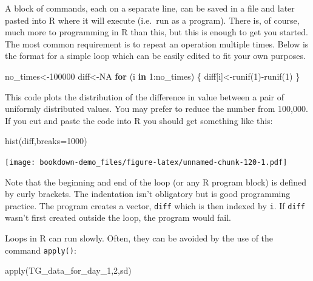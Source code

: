 \documentclass[
]{book}
\newenvironment{Shaded}{\begin{snugshade}}{\end{snugshade}}
\newcommand{\AttributeTok}[1]{\textcolor[rgb]{0.77,0.63,0.00}{#1}}
\newcommand{\ConstantTok}[1]{\textcolor[rgb]{0.00,0.00,0.00}{#1}}
\newcommand{\ControlFlowTok}[1]{\textcolor[rgb]{0.13,0.29,0.53}{\textbf{#1}}}
\newcommand{\DecValTok}[1]{\textcolor[rgb]{0.00,0.00,0.81}{#1}}
\newcommand{\FunctionTok}[1]{\textcolor[rgb]{0.00,0.00,0.00}{#1}}
\newcommand{\NormalTok}[1]{#1}
\newcommand{\OtherTok}[1]{\textcolor[rgb]{0.56,0.35,0.01}{#1}}
\newcommand{\SpecialCharTok}[1]{\textcolor[rgb]{0.00,0.00,0.00}{#1}}
\begin{document}
A block of commands, each on a separate line, can be saved in a file and later pasted into R where it will execute (i.e.~run as a program). There is, of course, much more to programming in R than this, but this is enough to get you started. The most common requirement is to repeat an operation multiple times. Below is the format for a simple loop which can be easily edited to fit your own purposes.

\begin{Shaded}
\begin{Highlighting}[]
\NormalTok{no\_times}\OtherTok{\textless{}{-}}\DecValTok{100000}
\NormalTok{diff}\OtherTok{\textless{}{-}}\ConstantTok{NA}
\ControlFlowTok{for}\NormalTok{ (i }\ControlFlowTok{in} \DecValTok{1}\SpecialCharTok{:}\NormalTok{no\_times) \{}
\NormalTok{diff[i]}\OtherTok{\textless{}{-}}\FunctionTok{runif}\NormalTok{(}\DecValTok{1}\NormalTok{)}\SpecialCharTok{{-}}\FunctionTok{runif}\NormalTok{(}\DecValTok{1}\NormalTok{)}
\NormalTok{\}}
\end{Highlighting}
\end{Shaded}

This code plots the distribution of the difference in value between a pair of uniformly distributed values. You may prefer to reduce the number from 100,000. If you cut and paste the code into R you should get something like this:

\begin{Shaded}
\begin{Highlighting}[]
\FunctionTok{hist}\NormalTok{(diff,}\AttributeTok{breaks=}\DecValTok{1000}\NormalTok{)}
\end{Highlighting}
\end{Shaded}

\texttt{[image: bookdown-demo\_files/figure-latex/unnamed-chunk-120-1.pdf]}

Note that the beginning and end of the loop (or any R program block) is defined by curly brackets. The indentation isn't obligatory but is good programming practice. The program creates a vector, \texttt{diff} which is then indexed by \texttt{i}. If \texttt{diff} wasn't first created outside the loop, the program would fail.

Loops in R can run slowly. Often, they can be avoided by the use of the command \texttt{apply()}:

\begin{Shaded}
\begin{Highlighting}[]
\FunctionTok{apply}\NormalTok{(TG\_data\_for\_day\_1,}\DecValTok{2}\NormalTok{,sd)}
\end{Highlighting}
\end{Shaded}
\end{document}
